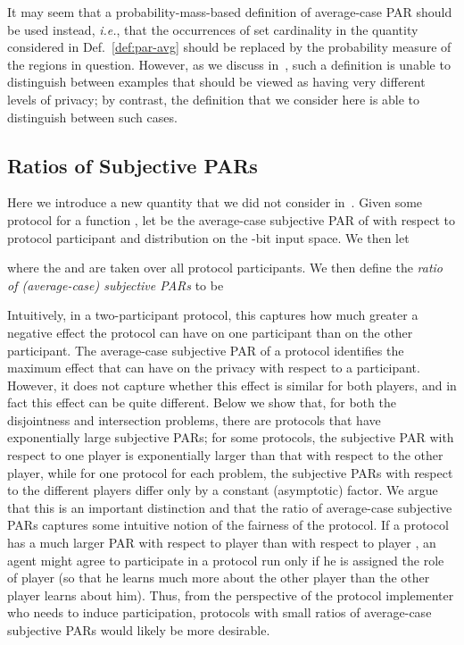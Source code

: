 \documentclass{article}
\theoremstyle{theorem}
\theoremstyle{definition}
\theoremstyle{remark}
\newcommand{\ie}{\emph{i.e.}}
\begin{document}
It may seem that a probability-mass-based definition of average-case PAR should be used instead, \ie, that the occurrences of set cardinality in the quantity considered in Def.~\ref{def:par-avg} should be replaced by the probability measure of the regions in question.  However, as we discuss in~\cite{fjs09tr14}, such a definition is unable to distinguish between examples that should be viewed as having very different levels of privacy; by contrast, the definition that we consider here is able to distinguish between such cases.

\subsection{Ratios of Subjective PARs}\label{ssec:ratio}

Here we introduce a new quantity that we did not consider in~\cite{fjs09tr14}.  Given some protocol  for a function , let  be the average-case subjective PAR of  with respect to protocol participant  and distribution  on the -bit input space.  We then let

where the  and  are taken over all protocol participants.  We then define the \emph{ratio of (average-case) subjective PARs} to be

Intuitively, in a two-participant protocol, this captures how much greater a negative effect the protocol  can have on one participant than on the other participant. The average-case subjective PAR of a protocol  identifies the maximum effect that  can have on the privacy with respect to a participant.  However, it does not capture whether this effect is similar for both players, and in fact this effect can be quite different.  Below we show that, for both the disjointness and intersection problems, there are protocols that have exponentially large subjective PARs; for some protocols, the subjective PAR with respect to one player is exponentially larger than that with respect to the other player, while for one protocol for each problem, the subjective PARs with respect to the different players differ only by a constant (asymptotic) factor.  We argue that this is an important distinction and that the ratio of average-case subjective PARs captures some intuitive notion of the fairness of the protocol.  If a protocol has a much larger PAR with respect to player  than with respect to player , an agent might agree to participate in a protocol run only if he is assigned the role of player  (so that he learns much more about the other player than the other player learns about him).  Thus, from the perspective of the protocol implementer who needs to induce participation, protocols with small ratios of average-case subjective PARs would likely be more desirable.
\end{document}
